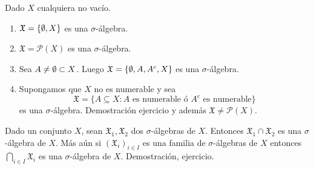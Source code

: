 \begin{eg}
    Dado $X$ cualquiera no vacío.
    \begin{enumerate}
        \item $\mathfrak{X} = \{ \emptyset, X \}$ es una $\sigma$-álgebra.
        \item $\mathfrak{X} = \mathcal{P}(X)$ es una $\sigma$-álgebra.
        \item Sea $A \neq \emptyset \subset X$. Luego $\mathfrak{X} = \{ \emptyset, A, A^c, X \}$ es una $\sigma$-álgebra.
        \item Supongamos que $X$ no es numerable y sea
              \begin{equation}
                  \mathfrak{X} = \{ A \subseteq X : A \text{ es numerable ó } A^c \text{ es numerable} \}
              \end{equation}
              es una $\sigma$-álgebra. Demostración ejercicio y además $\mathfrak{X} \neq \mathcal{P}(X)$.
    \end{enumerate}
\end{eg}

\begin{lemma}
    Dado un conjunto $X$, sean $\mathfrak{X}_1, \mathfrak{X}_2$ dos $\sigma$-álgebras de $X$. Entonces $\mathfrak{X}_1 \cap \mathfrak{X}_2$ es una $\sigma$-álgebra de $X$.
    Más aún si $(\mathfrak{X}_i)_{i \in I}$ es una familia de $\sigma$-álgebras de $X$ entonces $\bigcap_{i \in I} \mathfrak{X}_i$ es una $\sigma$-álgebra de $X$.
    Demostración, ejercicio.
\end{lemma}

\clearpage

